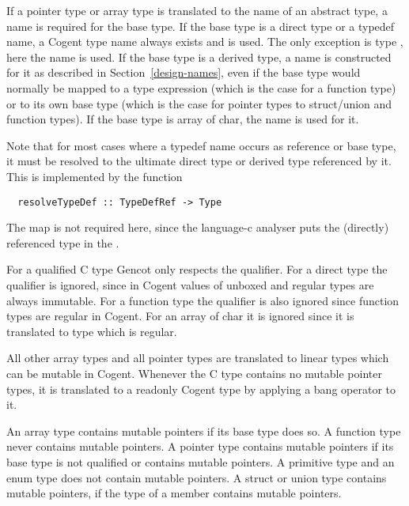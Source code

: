 If a pointer type or array type is translated to the name of an abstract type, a name is required for
the base type. If the base type is a direct type or a typedef name, a Cogent type name always exists 
and is used. The only exception is type , here the name  is used.
If the base type is a derived type, a name is constructed for it as described in Section~\ref{design-names},
even if the base type would normally be mapped to a type expression (which is the case for a function type)
or to its own base type (which is the case for pointer types to struct/union and function types). If the
base type is array of char, the name  is used for it. 

Note that for most cases where a typedef name occurs as reference or base type, it must be resolved to
the ultimate direct type or derived type referenced by it. This is implemented by the function
\begin{verbatim}
  resolveTypeDef :: TypeDefRef -> Type 
\end{verbatim}
The  map is not required here, since the language-c analyser puts the (directly) 
referenced type in the . 

For a qualified C type Gencot only respects the  qualifier. For a direct type the 
qualifier is ignored, since in Cogent values of unboxed and regular types are always immutable. For
a function type the qualifier is also ignored since function types are regular in Cogent. For an array
of char it is ignored since it is translated to type  which is regular.

All other array types and all pointer types are translated to linear types which can be mutable in
Cogent. Whenever the C type contains no mutable pointer types, it is translated to a readonly Cogent type by 
applying a bang operator to it.

An array type contains mutable pointers if its base type does so. A function type never contains mutable pointers.
A pointer type contains mutable pointers if its base type is not  qualified or contains mutable pointers.
A primitive type and an enum type does not contain mutable pointers. A struct or union type contains mutable 
pointers, if the type of a member contains mutable pointers.

